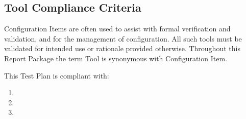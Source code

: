 \subsection{Tool Compliance Criteria}
Configuration Items are often used to assist with formal verification and
validation, and for the management of configuration.  All such tools must be
validated for intended use or rationale provided otherwise.  Throughout this
Report Package the term Tool is synonymous with Configuration Item.

This Test Plan is compliant with:
\begin{enumerate}
  \item \sopSDLC%
  \item \sopSCM%
  \item \sopPAP%
\end{enumerate}
